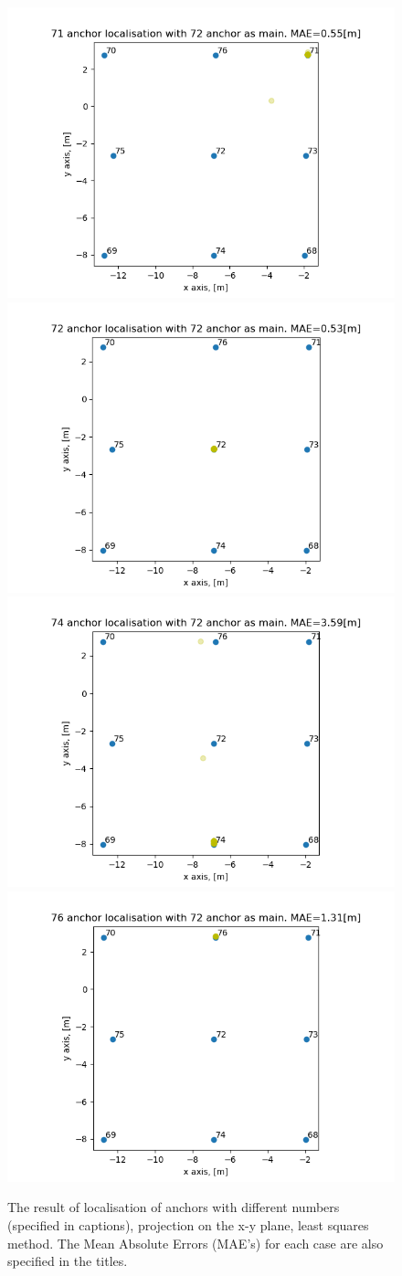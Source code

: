 \documentclass[journal]{IEEEtran}
\begin{document}
\begin{figure}[ht]%
    \centering
    \includegraphics[width=0.49\linewidth, height=0.4\textwidth]{graphics/ress/71_72.png}
    \includegraphics[width=0.49\linewidth, height=0.4\textwidth]{graphics/ress/72_72.png}
    \includegraphics[width=0.49\linewidth, height=0.4\textwidth]{graphics/ress/74_72.png}
    \includegraphics[width=0.49\linewidth, height=0.4\textwidth]{graphics/ress/76_72.png}
    \caption{The result of localisation of anchors with different numbers (specified in captions), projection on the x-y plane, least squares method. The Mean Absolute Errors (MAE's) for each case are also specified in the titles.}
    \label{fig:lq_res}
\end{figure}
\end{document}
